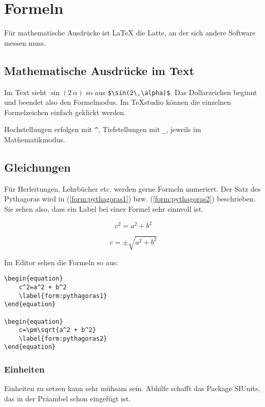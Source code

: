 	\section{Formeln}
		Für mathematische Ausdrücke ist \LaTeX{} die Latte, an der sich andere Software messen muss.
		
		\subsection{Mathematische Ausdrücke im Text}
			Im Text sieht $\sin(2\,\alpha)$ so aus \verb"$\sin(2\,\alpha)$". Das Dollarzeichen beginnt und beendet also den Formelmodus. Im TeXstudio können die einzelnen Formelzeichen einfach geklickt werden.
			
			Hochstellungen erfolgen mit \verb"^", Tiefstellungen mit \verb"_", jeweils im Mathematikmodus.
			
		\subsection{Gleichungen}
			Für Herleitungen, Lehrbücher etc. werden gerne Formeln numeriert. Der Satz des Pythagoras wird in (\ref{form:pythagoras1}) bzw. (\ref{form:pythagoras2}) beschrieben. Sie sehen also, dass ein Label bei einer Formel sehr sinnvoll ist.
			
			\begin{equation}
				c^2=a^2 + b^2
				\label{form:pythagoras1}
			\end{equation}
			
			\begin{equation}
				c=\pm\sqrt{a^2 + b^2}
				\label{form:pythagoras2}
			\end{equation}
			
			Im Editor sehen die Formeln so aus:
\begin{verbatim}
\begin{equation}
    c^2=a^2 + b^2
    \label{form:pythagoras1}
\end{equation}
			
\begin{equation}
    c=\pm\sqrt{a^2 + b^2}
    \label{form:pythagoras2}
\end{equation}
\end{verbatim}			
			
		\subsubsection{Einheiten}
			Einheiten zu setzen kann sehr mühsam sein. Abhilfe schafft das Package SIUnits, das in der Präambel schon eingefügt ist.
			
